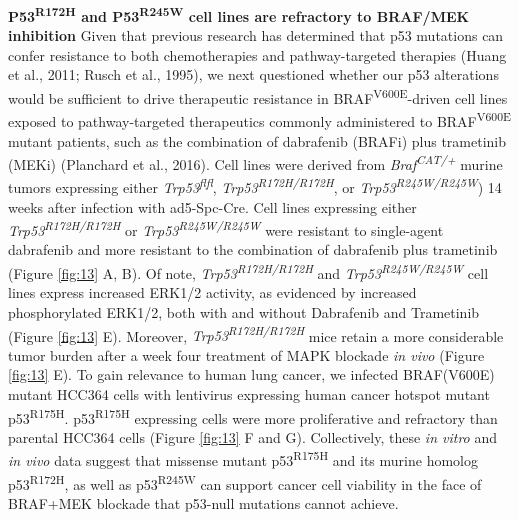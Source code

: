 \textbf{P53\textsuperscript{R172H} and P53\textsuperscript{R245W} cell lines are refractory to BRAF/MEK inhibition}
Given that previous research has determined that p53 mutations can confer resistance to both chemotherapies and pathway-targeted therapies (Huang et al., 2011; Rusch et al., 1995), we next questioned whether our p53 alterations would be sufficient to drive therapeutic resistance in BRAF\textsuperscript{V600E}-driven cell lines exposed to pathway-targeted therapeutics commonly administered to BRAF\textsuperscript{V600E} mutant patients, such as the combination of dabrafenib (BRAFi) plus trametinib (MEKi) (Planchard et al., 2016). Cell lines were derived from \emph{Braf\textsuperscript{CAT/+}} murine tumors expressing either \emph{Trp53\textsuperscript{flfl}}, \emph{Trp53\textsuperscript{R172H/R172H}}, or \emph{Trp53\textsuperscript{R245W/R245W}}) 14 weeks after infection with ad5-Spc-Cre. Cell lines expressing either \emph{Trp53\textsuperscript{R172H/R172H}} or \emph{Trp53\textsuperscript{R245W/R245W}} were resistant to single-agent dabrafenib and more resistant to the combination of dabrafenib plus trametinib (Figure \ref{fig:13} A, B). Of note, \emph{Trp53\textsuperscript{R172H/R172H}} and \emph{Trp53\textsuperscript{R245W/R245W}} cell lines express increased ERK1/2 activity, as evidenced by increased phosphorylated ERK1/2, both with and without Dabrafenib and Trametinib (Figure \ref{fig:13} E). Moreover, \emph{Trp53\textsuperscript{R172H/R172H}} mice retain a more considerable tumor burden after a week four treatment of MAPK blockade \emph{in vivo} (Figure \ref{fig:13} E). To gain relevance to human lung cancer, we infected BRAF(V600E) mutant HCC364 cells with lentivirus expressing human cancer hotspot mutant p53\textsuperscript{R175H}. p53\textsuperscript{R175H} expressing cells were more proliferative and refractory than parental HCC364 cells (Figure \ref{fig:13} F and G). Collectively, these \emph{in vitro} and \emph{in vivo} data suggest that missense mutant p53\textsuperscript{R175H} and its murine homolog p53\textsuperscript{R172H}, as well as p53\textsuperscript{R245W} can support cancer cell viability in the face of BRAF+MEK blockade that p53-null mutations cannot achieve.

